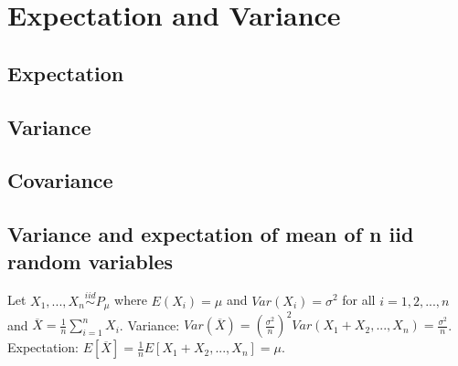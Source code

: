 \section{Expectation and Variance}
\subsection*{Expectation}
\subsection*{Variance}
\subsection*{Covariance}
\subsection*{Variance and expectation of mean of n iid random variables}
Let $X_1, ..., X_n \stackrel{iid}{\sim} P_{\mu}$ where $E(X_i)=\mu$ and $Var(X_i)=\sigma^2$ for all $i=1,2,...,n$ and $\overline{X}= \frac{1}{n} \sum_{i=1}^{n} X_i$. Variance: $Var(\overline{X})=(\frac{\sigma^2}{n})^2 Var(X_1 + X_2,...,X_n) =  \frac{\sigma^2}{n}$. Expectation: $E[\overline{X}]=\frac{1}{n}E[X_1 + X_2,...,X_n] = \mu$.